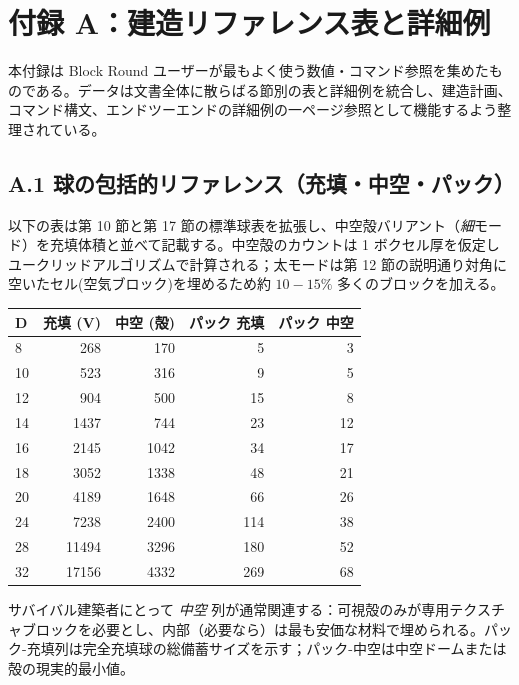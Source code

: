 \documentclass[12pt,a4paper]{scrartcl}
\begin{document}
\clearpage

\section*{\color{accent}付録 A：建造リファレンス表と詳細例}

本付録は Block Round ユーザーが最もよく使う数値・コマンド参照を集めたものである。データは文書全体に散らばる節別の表と詳細例を統合し、建造計画、コマンド構文、エンドツーエンドの詳細例の一ページ参照として機能するよう整理されている。

\subsection*{A.1 球の包括的リファレンス（充填・中空・パック）}
以下の表は第 10 節と第 17 節の標準球表を拡張し、中空殻バリアント（\emph{細}モード）を充填体積と並べて記載する。中空殻のカウントは 1 ボクセル厚を仮定しユークリッドアルゴリズムで計算される；太モードは第 12 節の説明通り対角に空いたセル(空気ブロック)を埋めるため約 $10{-}15\%$ 多くのブロックを加える。

\vspace{0.4em}
\begin{center}
\begin{tabular}{@{}lrrrr@{}}
\toprule
\textbf{D} & \textbf{充填 (V)} & \textbf{中空 (殻)} & \textbf{パック 充填} & \textbf{パック 中空} \\
\midrule
8   &   268 &   170 &  5  &  3  \\
10  &   523 &   316 &  9  &  5  \\
12  &   904 &   500 & 15  &  8  \\
14  &  1437 &   744 & 23  & 12  \\
16  &  2145 &  1042 & 34  & 17  \\
18  &  3052 &  1338 & 48  & 21  \\
20  &  4189 &  1648 & 66  & 26  \\
24  &  7238 &  2400 & 114 & 38  \\
28  & 11494 &  3296 & 180 & 52  \\
32  & 17156 &  4332 & 269 & 68  \\
\bottomrule
\end{tabular}
\end{center}

サバイバル建築者にとって \emph{中空} 列が通常関連する：可視殻のみが専用テクスチャブロックを必要とし、内部（必要なら）は最も安価な材料で埋められる。パック-充填列は完全充填球の総備蓄サイズを示す；パック-中空は中空ドームまたは殻の現実的最小値。
\end{document}
